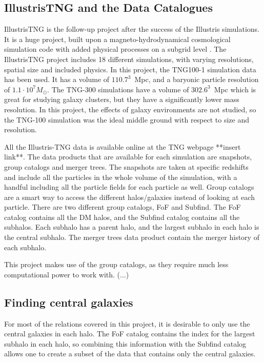 \subsection{IllustrisTNG and the Data Catalogues}

IllustrisTNG is the follow-up project after the success of the Illustris simulations. It is a huge project, built upon a magneto-hydrodynamical cosmological simulation code with added physical processes on a subgrid level \parencite{Weinberger2016}. The IllustrisTNG project includes 18 different simulations, with varying resolutions, spatial size and included physics. In this project, the TNG100-1 simulation data has been used. It has a volume of $110.7^3 \,$ Mpc, and a baryonic particle resolution of $1.1 \cdot 10^7 M_{\odot}$. The TNG-300 simulations have a volume of $302.6^3 \,$ Mpc which is great for studying galaxy clusters, but they have a significantly lower mass resolution. In this project, the effects of galaxy environments are not studied, so the TNG-100 simulation was the ideal middle ground with respect to size and resolution.

All the Illustris-TNG data is available online at the TNG webpage **insert link**. The data products that are available for each simulation are snapshots, group catalogs and merger trees. The snapshots are taken at specific redshifts and include all the particles in the whole volume of the simulation, with a handful including all the particle fields for each particle as well. Group catalogs are a smart way to access the different halos/galaxies instead of looking at each particle. There are two different group catalogs, FoF and Subfind. The FoF catalog contains all the DM halos, and the Subfind catalog contains all the subhalos. Each subhalo has a parent halo, and the largest subhalo in each halo is the central subhalo. The merger trees data product contain the merger history of each subhalo.

This project makes use of the group catalogs, as they require much less computational power to work with. (...)


\subsection{Finding central galaxies}
For most of the relations covered in this project, it is desirable to only use the central galaxies in each halo. The FoF catalog contains the index for the largest subhalo in each halo, so combining this information with the Subfind catalog allows one to create a subset of the data that contains only the central galaxies.

